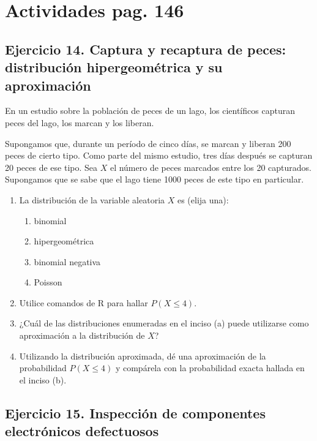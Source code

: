 \documentclass[10pt]{article}
\begin{document}
\newpage
\tableofcontents
\thispagestyle{plain}
\clearpage

\section{Actividades pag. 146}

\subsection{Ejercicio 14. Captura y recaptura de peces: distribución hipergeométrica y su aproximación}

En un estudio sobre la población de peces de un lago, los científicos capturan peces del lago, los marcan y los liberan.

Supongamos que, durante un período de cinco días, se marcan y liberan 200 peces de cierto tipo. Como parte del mismo estudio, tres días después se capturan 20 peces de ese tipo. Sea $X$ el número de peces marcados entre los 20 capturados. Supongamos que se sabe que el lago tiene 1000 peces de este tipo en particular.

\begin{enumerate}[label=(\alph*)]
    \item La distribución de la variable aleatoria $X$ es (elija una):
    \begin{enumerate}[label=(\roman*)]
        \item binomial
        \item hipergeométrica
        \item binomial negativa
        \item Poisson
    \end{enumerate}

    \item Utilice comandos de R para hallar $P(X \leq 4)$.

    \item ¿Cuál de las distribuciones enumeradas en el inciso (a) puede utilizarse como aproximación a la distribución de $X$?

    \item Utilizando la distribución aproximada, dé una aproximación de la probabilidad $P(X \leq 4)$ y compárela con la probabilidad exacta hallada en el inciso (b).
\end{enumerate}

\subsection{Ejercicio 15. Inspección de componentes electrónicos defectuosos}
\end{document}
